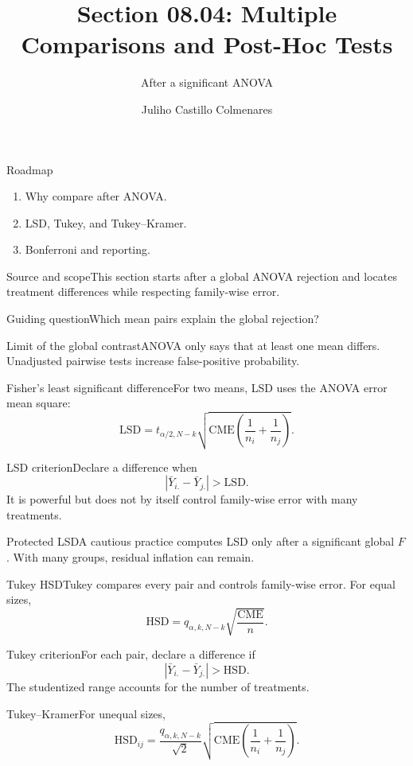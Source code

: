 \documentclass[10pt,aspectratio=169]{beamer}
\title[Post-hoc comparisons]{Section 08.04: Multiple Comparisons and Post-Hoc Tests}\subtitle{After a significant ANOVA}
\author[J. Castillo Colmenares]{Juliho Castillo Colmenares}\institute{Tecnológico de Monterrey}\date{}
\begin{document}
\begin{frame}[plain]\titlepage\end{frame}
\begin{frame}{Roadmap}\small\begin{enumerate}\item Why compare after ANOVA.\item LSD, Tukey, and Tukey--Kramer.\item Bonferroni and reporting.\end{enumerate}\end{frame}
\begin{frame}{Source and scope}\small This section starts after a global ANOVA rejection and locates treatment differences while respecting family-wise error.\begin{block}{Guiding question}Which mean pairs explain the global rejection?\end{block}\end{frame}
\begin{frame}{Limit of the global contrast}\small ANOVA only says that at least one mean differs. Unadjusted pairwise tests increase false-positive probability.\end{frame}
\begin{frame}{Fisher's least significant difference}\small For two means, LSD uses the ANOVA error mean square:\[\mathrm{LSD}=t_{\alpha/2,N-k}\sqrt{\mathrm{CME}\left(\frac1{n_i}+\frac1{n_j}\right)}.\]\end{frame}
\begin{frame}{LSD criterion}\small Declare a difference when\[|\bar Y_{i.}-\bar Y_{j.}|>\mathrm{LSD}.\]It is powerful but does not by itself control family-wise error with many treatments.\end{frame}
\begin{frame}{Protected LSD}\small A cautious practice computes LSD only after a significant global $F$. With many groups, residual inflation can remain.\end{frame}
\begin{frame}{Tukey HSD}\small Tukey compares every pair and controls family-wise error. For equal sizes,\[\mathrm{HSD}=q_{\alpha,k,N-k}\sqrt{\frac{\mathrm{CME}}n}.\]\end{frame}
\begin{frame}{Tukey criterion}\small For each pair, declare a difference if\[|\bar Y_{i.}-\bar Y_{j.}|>\mathrm{HSD}.\]The studentized range accounts for the number of treatments.\end{frame}
\begin{frame}{Tukey--Kramer}\small For unequal sizes,\[\mathrm{HSD}_{ij}=\frac{q_{\alpha,k,N-k}}{\sqrt2}\sqrt{\mathrm{CME}\left(\frac1{n_i}+\frac1{n_j}\right)}.\]\end{frame}
\end{document}

